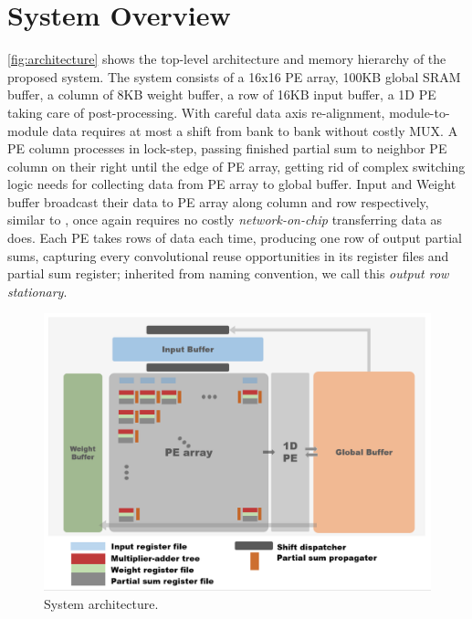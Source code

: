 \section{System Overview}
\autoref{fig:architecture} shows the top-level architecture and memory hierarchy of the proposed system. The system consists of a 16x16 PE array, 100KB global SRAM buffer, a column of 8KB weight buffer, a row of 16KB input buffer, a 1D PE taking care of post-processing. With careful data axis re-alignment, module-to-module data requires at most a shift from bank to bank without costly MUX. A PE column processes in lock-step, passing finished partial sum to neighbor PE column on their right until the edge of PE array, getting rid of complex switching logic needs for collecting data from PE array to global buffer. Input and Weight buffer broadcast their data to PE array along column and row respectively, similar to \cite{PrecisionScalableVLSI}\cite{ENVISION}, once again requires no costly \textit{network-on-chip} transferring data as \cite{Eyeriss} does. Each PE takes rows of data each time, producing one row of output partial sums, capturing every convolutional reuse opportunities in its register files and partial sum register; inherited from \cite{Eyeriss} naming convention, we call this \textit{output row stationary}.  
\begin{figure}
    \centering
    \includegraphics[width=0.8\linewidth]{inc/4_proposed_architecture/figure/architecture.png}
    \caption{System architecture.}
    \label{fig:architecture}
\end{figure}



